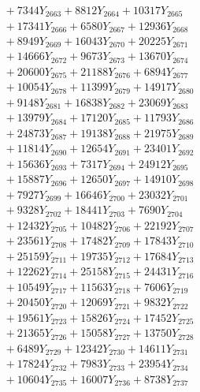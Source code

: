 \documentclass[a4paper,10pt]{article}
\begin{document}
{\begin{align}
&\;  + 7344 Y_{2663} + 8812 Y_{2664} + 10317 Y_{2665} \\[0.3ex]
&\;  + 17341 Y_{2666} + 6580 Y_{2667} + 12936 Y_{2668} \\[0.5ex]\allowbreak
&\;  + 8949 Y_{2669} + 16043 Y_{2670} + 20225 Y_{2671} \\[0.3ex]
&\;  + 14666 Y_{2672} + 9673 Y_{2673} + 13670 Y_{2674} \\[0.3ex]
&\;  + 20600 Y_{2675} + 21188 Y_{2676} + 6894 Y_{2677} \\[0.3ex]
&\;  + 10054 Y_{2678} + 11399 Y_{2679} + 14917 Y_{2680} \\[0.3ex]
&\;  + 9148 Y_{2681} + 16838 Y_{2682} + 23069 Y_{2683} \\[0.3ex]
&\;  + 13979 Y_{2684} + 17120 Y_{2685} + 11793 Y_{2686} \\[0.3ex]
&\;  + 24873 Y_{2687} + 19138 Y_{2688} + 21975 Y_{2689} \\[0.3ex]
&\;  + 11814 Y_{2690} + 12654 Y_{2691} + 23401 Y_{2692} \\[0.3ex]
&\;  + 15636 Y_{2693} + 7317 Y_{2694} + 24912 Y_{2695} \\[0.3ex]
&\;  + 15887 Y_{2696} + 12650 Y_{2697} + 14910 Y_{2698} \\[0.5ex]\allowbreak
&\;  + 7927 Y_{2699} + 16646 Y_{2700} + 23032 Y_{2701} \\[0.3ex]
&\;  + 9328 Y_{2702} + 18441 Y_{2703} + 7690 Y_{2704} \\[0.3ex]
&\;  + 12432 Y_{2705} + 10482 Y_{2706} + 22192 Y_{2707} \\[0.3ex]
&\;  + 23561 Y_{2708} + 17482 Y_{2709} + 17843 Y_{2710} \\[0.3ex]
&\;  + 25159 Y_{2711} + 19735 Y_{2712} + 17684 Y_{2713} \\[0.3ex]
&\;  + 12262 Y_{2714} + 25158 Y_{2715} + 24431 Y_{2716} \\[0.3ex]
&\;  + 10549 Y_{2717} + 11563 Y_{2718} + 7606 Y_{2719} \\[0.3ex]
&\;  + 20450 Y_{2720} + 12069 Y_{2721} + 9832 Y_{2722} \\[0.3ex]
&\;  + 19561 Y_{2723} + 15826 Y_{2724} + 17452 Y_{2725} \\[0.3ex]
&\;  + 21365 Y_{2726} + 15058 Y_{2727} + 13750 Y_{2728} \\[0.5ex]\allowbreak
&\;  + 6489 Y_{2729} + 12342 Y_{2730} + 14611 Y_{2731} \\[0.3ex]
&\;  + 17824 Y_{2732} + 7983 Y_{2733} + 23954 Y_{2734} \\[0.3ex]
&\;  + 10604 Y_{2735} + 16007 Y_{2736} + 8738 Y_{2737} \\[0.3ex]

\end{align}}
\end{document}
